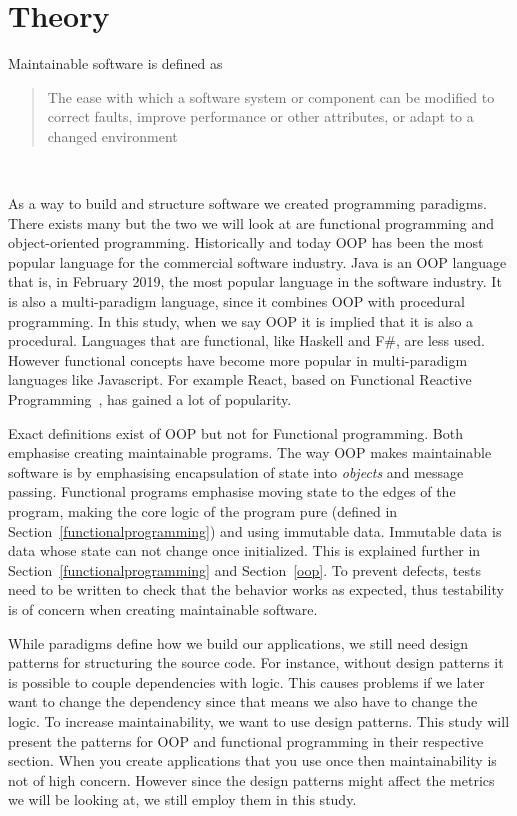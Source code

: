 \chapter{Theory}\label{theory} 

Maintainable software is defined as 

\blockquote{The ease with which a software system or component can be modified
to correct faults, improve performance or other attributes, or adapt to a
changed environment}~\cite{7965364} 

As a way to build and structure software we created programming paradigms.
There exists many but the two we will look at are functional programming and
object-oriented programming.  Historically and today OOP has been the most
popular language for the commercial software industry. Java is an OOP language
that is, in February 2019, the most popular language in the software industry.
It is also a multi-paradigm language, since it combines OOP with procedural
programming. In this study, when we say OOP it is implied that it is also a
procedural.  Languages that are functional, like Haskell and F\#, are less
used.~\cite{tiobe} However functional concepts have become more popular in
multi-paradigm languages like Javascript.  For example React, based on
Functional Reactive Programming~\cite{reactisfrp}, has gained a lot of
popularity.~\cite{popularityreact} 

Exact definitions exist of OOP but not for Functional programming. Both
emphasise creating maintainable programs.  The way OOP makes maintainable software is by
emphasising encapsulation of state into \textit{objects} and message passing.
Functional programs emphasise moving state to the edges of the program, making
the core logic of the program pure (defined in
Section~\ref{functionalprogramming}) and using immutable data.  Immutable data
is data whose state can not change once initialized. This is explained further
in Section~\ref{functionalprogramming} and Section~\ref{oop}. To prevent
defects, tests need to be written to check that the behavior works as expected,
thus testability is of concern when creating maintainable software.

While paradigms define how we build our applications, we still need design
patterns for structuring the source code. For instance, without design patterns
it is possible to couple dependencies with logic. This causes problems if we
later want to change the dependency since that means we also have to change the
logic. To increase maintainability, we want to use design patterns. This
study will present the patterns for OOP and functional programming in their
respective section. When you create applications that you use once then
maintainability is not of high concern. However since the design patterns might
affect the metrics we will be looking at, we still employ them in this study. 

